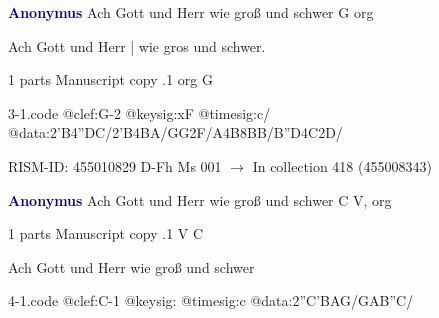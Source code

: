 \documentclass[twocolumn]{book}
\begin{document}
\newline \par \vspace{7pt} \textcolor{darkblue}{\textbf{Anonymus  }}
\newline Ach Gott und Herr wie groß und schwer  G  
\newline org
\newline \begin{itshape}[f.15v, at left:] Ach Gott und Herr | wie gros und schwer.\end{itshape} 
\newline \textcolor{darkblue}{}  1 parts  
\newline Manuscript copy
.1  org  G  
\begin{filecontents*}{3-1.code}
@clef:G-2
@keysig:xF
@timesig:c/
@data:2'B4''DC/2'B4BA/GG2F/A4B{8BB}/{B''D}4C2D/
\end{filecontents*}
\newline
%

\newline RISM-ID: 455010829
\newline D-Fh  Ms 001
\newline $\rightarrow$ In collection 418 (455008343)

\newline \par \vspace{7pt} \textcolor{darkblue}{\textbf{Anonymus  }}
\newline Ach Gott und Herr wie groß und schwer  C  
\newline V, org
\newline \begin{itshape}\end{itshape} 
\newline \textcolor{darkblue}{}  1 parts  
\newline Manuscript copy
.1  V  C
\newline \begin{footnotesize} Ach Gott und Herr wie groß und schwer \end{footnotesize}  
\begin{filecontents*}{4-1.code}
@clef:C-1
@keysig:
@timesig:c
@data:2''C'BAG/GAB''C/
\end{filecontents*}
\newline
%
\end{document}
